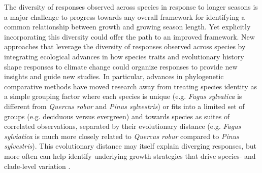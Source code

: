 \documentclass[11pt]{article}
\begin{document}
The diversity of responses observed across species in response to longer seasons is a major challenge to progress towards any overall framework for identifying a common relationship between growth and growing season length. Yet explicitly incorporating this diversity could offer the path to an improved framework. New approaches that leverage the diversity of responses observed across species by integrating ecological advances in how species traits and evolutionary history shape responses to climate change  \citep{cornwell2017phylogenetic,harmonebook} could organize responses to provide new insights and guide new studies. In particular, advances in phylogenetic comparative methods \citep{Webb:2002or} have moved research away from treating species identity as a simple grouping factor where each species is unique (e.g. \emph{Fagus sylvatica} is different from \emph{Quercus robur} and \emph{Pinus sylvestris}) or fits into a limited set of groups (e.g. deciduous versus evergreen) and towards species as suites of correlated observations, separated by their evolutionary distance (e.g. \emph{Fagus sylviatica} is much more closely related to \emph{Quercus robur} compared to \emph{Pinus sylvestris}). This evolutionary distance may itself explain diverging responses, but more often can help identify underlying growth strategies that drive species- and clade-level variation \citep[][]{pearse2019interaction,morales2024phylogenetic}. %
\end{document}

